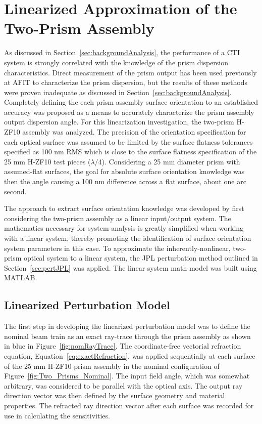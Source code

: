 \section{Linearized Approximation of the Two-Prism Assembly}
\label{sec:linearPrism}

As discussed in Section~\ref{sec:backgroundAnalysis}, the performance of a CTI system is strongly correlated with the knowledge of the prism dispersion characteristics. Direct measurement of the prism output has been used previously at \ac{AFIT} to characterize the prism dispersion, but the results of these methods were proven inadequate as discussed in Section~\ref{sec:backgroundAnalysis}. Completely defining the each prism assembly surface orientation to an established accuracy was proposed as a means to accurately characterize the prism assembly output dispersion angle. For this linearization investigation, the two-prism H-ZF10 assembly was analyzed. The precision of the orientation specification for each optical surface was assumed to be limited by the surface flatness tolerances specified as 100 nm RMS which is close to the surface flatness specification of the 25 mm H-ZF10 test pieces ($\lambda$/4). Considering a 25 mm diameter prism with assumed-flat surfaces, the goal for absolute surface orientation knowledge was then the angle causing a 100 nm difference across a flat surface, about one arc second.

The approach to extract surface orientation knowledge was developed by first considering the two-prism assembly as a linear input/output system. The mathematics necessary for system analysis is greatly simplified when working with a linear system, thereby promoting the identification of surface orientation system parameters in this case. To approximate the inherently-nonlinear, two-prism optical system to a linear system, the JPL perturbation method outlined in Section~\ref{sec:pertJPL} was applied. The linear system math model was built using MATLAB.

\subsection{Linearized Perturbation Model}
The first step in developing the linearized perturbation model was to define the nominal beam train as an exact ray-trace through the prism assembly as shown in blue in Figure~\ref{fig:nomRayTrace}. The coordinate-free vectorial refraction equation, Equation~\eqref{eq:exactRefraction}, was applied sequentially at each surface of the 25 mm H-ZF10 prism assembly in the nominal configuration of Figure~\ref{fig:Two_Prisms_Nominal}. The input field angle, which was somewhat arbitrary, was considered to be parallel with the optical axis. The output ray direction vector was then defined by the surface geometry and material properties. The refracted ray direction vector after each surface was recorded for use in calculating the sensitivities. 

